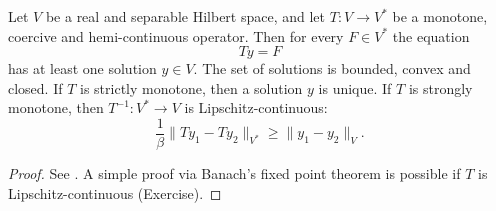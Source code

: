 \documentclass[../skript.tex]{subfiles}
\begin{document}
\begin{theorem} %
\label{thm:c4e4}
Let $V$ be a real and separable Hilbert space, and let $T : V \to V^*$ be a monotone, coercive and hemi-continuous operator. Then for every $F \in V^*$ the equation
\[
	Ty = F
\]
has at least one solution $y \in V$. The set of solutions is bounded, convex and closed. If $T$ is strictly monotone, then a solution $y$ is unique. If $T$ is strongly monotone, then $T^{-1} : V^* \to V$ is Lipschitz-continuous: 
\[
	\frac{1}{\beta} \| T y_1 - T y_2 \|_{V^*} \geq \| y_1 - y_2 \|_V.
\]
\end{theorem}
\begin{proof}
See \cite{Zeidler2B}. %
A simple proof via Banach's fixed point theorem is possible if $T$ is Lipschitz-continuous (Exercise).
\end{proof}
\end{document}
